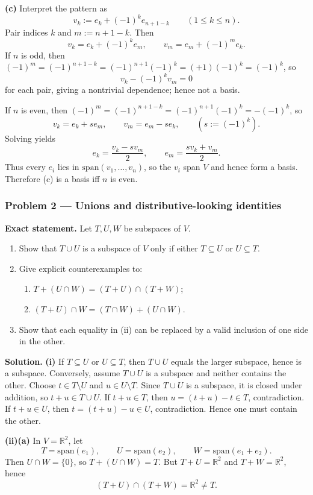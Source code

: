 \documentclass[12pt,a4paper]{article}
\theoremstyle{plain}
\theoremstyle{definition}      %
\begin{document}
\medskip
\noindent\textbf{(c)} Interpret the pattern as
\[
v_k:=e_k+(-1)^k e_{n+1-k}\qquad (1\le k\le n).
\]
Pair indices $k$ and $m:=n+1-k$. Then
\[
v_k=e_k+(-1)^k e_m,\qquad
v_m=e_m+(-1)^m e_k.
\]
If $n$ is odd, then $(-1)^m=(-1)^{n+1-k}=(-1)^{n+1}(-1)^k=(+1)(-1)^k=(-1)^k$, so
\[
v_k-(-1)^k v_m = 0
\]
for each pair, giving a nontrivial dependence; hence not a basis.

If $n$ is even, then $(-1)^m=(-1)^{n+1-k}=(-1)^{n+1}(-1)^k=-( -1)^k$, so
\[
v_k=e_k+s e_m,\qquad v_m=e_m-s e_k,\qquad (s:=(-1)^k).
\]
Solving yields
\[
e_k=\frac{v_k-sv_m}{2},\qquad e_m=\frac{sv_k+v_m}{2}.
\]
Thus every $e_i$ lies in $\mathrm{span}(v_1,\dots,v_n)$, so the $v_i$ span $V$ and hence form a basis.
Therefore (c) is a basis iff $n$ is even.

\bigskip

\subsubsection*{Problem 2 — Unions and distributive-looking identities}

\textbf{Exact statement.}
Let $T,U,W$ be subspaces of $V$.
\begin{enumerate}
	\item[(i)] Show that $T\cup U$ is a subspace of $V$ only if either $T\subseteq U$ or $U\subseteq T$.
	\item[(ii)] Give explicit counterexamples to:
	\begin{enumerate}
		\item[(a)] $T+(U\cap W)=(T+U)\cap(T+W)$;
		\item[(b)] $(T+U)\cap W=(T\cap W)+(U\cap W)$.
	\end{enumerate}
	\item[(iii)] Show that each equality in (ii) can be replaced by a valid inclusion of one side in the other.
\end{enumerate}

\textbf{Solution.}
\textbf{(i)} If $T\subseteq U$ or $U\subseteq T$, then $T\cup U$ equals the larger subspace, hence is a subspace.
Conversely, assume $T\cup U$ is a subspace and neither contains the other.
Choose $t\in T\setminus U$ and $u\in U\setminus T$. Since $T\cup U$ is a subspace, it is closed under addition,
so $t+u\in T\cup U$. If $t+u\in T$, then $u=(t+u)-t\in T$, contradiction. If $t+u\in U$, then
$t=(t+u)-u\in U$, contradiction. Hence one must contain the other.

\medskip
\textbf{(ii)(a)} In $V=\mathbb R^2$, let
\[
T=\mathrm{span}(e_1),\qquad U=\mathrm{span}(e_2),\qquad W=\mathrm{span}(e_1+e_2).
\]
Then $U\cap W=\{0\}$, so $T+(U\cap W)=T$. But $T+U=\mathbb R^2$ and $T+W=\mathbb R^2$, hence
\[
(T+U)\cap(T+W)=\mathbb R^2\neq T.
\]
\end{document}
